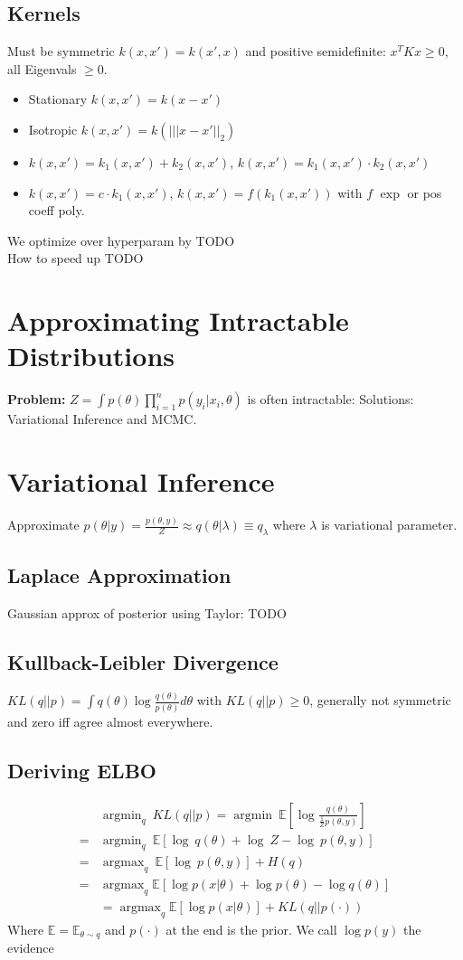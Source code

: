 \documentclass[11pt]{article}
\newcommand{\argmin}{\operatorname{argmin}}
\newcommand{\argmax}{\operatorname{argmax}}
\newcommand{\E}{\mathbb{E}}
\begin{document}
\begin{multicols*}{3}
	\subsection*{Kernels}
	Must be symmetric $k(x,x') = k(x',x)$ and positive semidefinite: $x^TKx \geq 0$, all Eigenvals $\geq 0$.
	\begin{itemize}
		\item Stationary $k(x,x') = k(x-x')$
		\item Isotropic $k(x,x') = k(|||x-x'||_2)$
		\item $k(x,x') = k_1(x,x') + k_2(x,x')$, $k(x,x') = k_1(x,x') \cdot k_2(x,x')$
		\item $k(x,x') = c\cdot k_1(x,x')$, $k(x,x') = f(k_1(x,x'))$ with $f$ $\exp$ or pos coeff poly.
	\end{itemize}
	We optimize over hyperparam by TODO \\
	How to speed up TODO
	
	\section*{Approximating Intractable Distributions}
	\textbf{Problem:} $Z = \int p(\theta) \prod_{i=1}^{n} p(y_i| x_i, \theta)$ is often intractable: Solutions: Variational Inference and MCMC.
	
	\section*{Variational Inference}
	Approximate $p(\theta|y) = \frac{p(\theta, y)}{Z}\approx q(\theta| \lambda)\equiv q_\lambda$ where $\lambda$ is variational parameter.
	\subsection*{Laplace Approximation}
	Gaussian approx of posterior using Taylor: 
	TODO
	\subsection*{Kullback-Leibler Divergence}
	$KL(q||p) = \int q(\theta) \log \frac{q(\theta)}{p(\theta)} d\theta$ with $KL(q||p) \geq 0$, generally not symmetric and zero iff agree almost everywhere.
	
	\subsection*{Deriving ELBO}
	\begin{align*}
		&\argmin_q \ KL(q||p) = \argmin \ \E[ \log \frac{q(\theta)}{\frac{1}{Z} p(\theta,y)} ]\\
	=& \argmin_q \  \E\left[ \log \ q(\theta) + \log \ Z - \log \ p(\theta,y) \right]\\
	=&  \argmax_q \ \E\left[ \log \ p(\theta,y) \right] + H(q)\\
	=& \argmax_q \E \left[ \log p(x| \theta) + \log p(\theta) - \log q(\theta) \right] \\
	&= \argmax_q \E \left[ \log p(x| \theta) \right] + KL(q||p(\cdot))
	\end{align*}
Where $\E = \E_{\theta \sim q}$ and $p(\cdot)$ at the end is the prior.
We call $\log p(y)$ the evidence


\end{multicols*}
\end{document}
